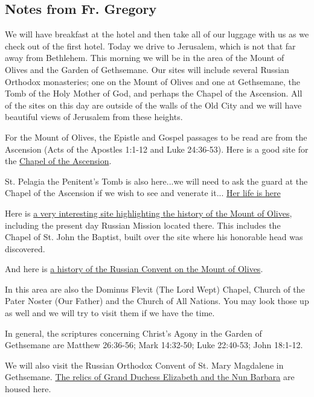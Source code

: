 \documentclass[letterpaper]{report}
\begin{document}
\subsection{Notes from Fr. Gregory}
We will have breakfast at the hotel and then take all of our luggage with us 
as we check out of the first hotel.
Today we drive to Jerusalem, which is not that far away from Bethlehem.
This morning we will be in the area of the Mount of Olives and the Garden of
Gethsemane.
Our sites will include several Russian Orthodox monasteries;
one on the Mount of Olives and one at Gethsemane,
the Tomb of the Holy Mother of God,
and perhaps the Chapel of the Ascension.
All of the sites on this day are outside of the walls of the Old City and we
will have beautiful views of Jerusalem from these heights.

For the Mount of Olives, the Epistle and Gospel passages to be read are from
the Ascension (Acts of the Apostles 1:1-12 and Luke 24:36-53).
Here is a good site for the 
\href{http://www.sacred-destinations.com/israel/jerusalem-chapel-of-ascension}{
    Chapel of the Ascension}.

St. Pelagia the Penitent's Tomb is also here...we will need to ask the guard 
at the Chapel of the Ascension if we wish to see and venerate it...
\href{http://www.antiochian.org/node/16762}{
	Her life is here}

Here is 
\href{http://www.pravoslavie.ru/english/46854.htm}{
	a very interesting site highlighting the history of the Mount of Olives},
 including the present day Russian Mission located there.
 This includes the Chapel of St. John the Baptist,
 built over the site where his honorable head was discovered.

And here is \href{http://jerusalem-mission.org/convent_ascension.html}{
	a history of the Russian Convent on the Mount of Olives}.

In this area are also the Dominus Flevit (The Lord Wept) Chapel,
Church of the Pater Noster (Our Father) and the Church of All Nations.
You may look those up as well and we will try to visit them if we have the 
time.

In general, the scriptures concerning Christ's Agony in the Garden of 
Gethsemane are Matthew 26:36-56; Mark 14:32-50; Luke 22:40-53; John 18:1-12.

We will also visit the Russian Orthodox Convent of St. Mary Magdalene in
Gethsemane.
\href{http://www.pravoslavie.ru/english/63239.htm}{
The relics of Grand Duchess Elizabeth and the Nun Barbara} are housed here.
\end{document}
